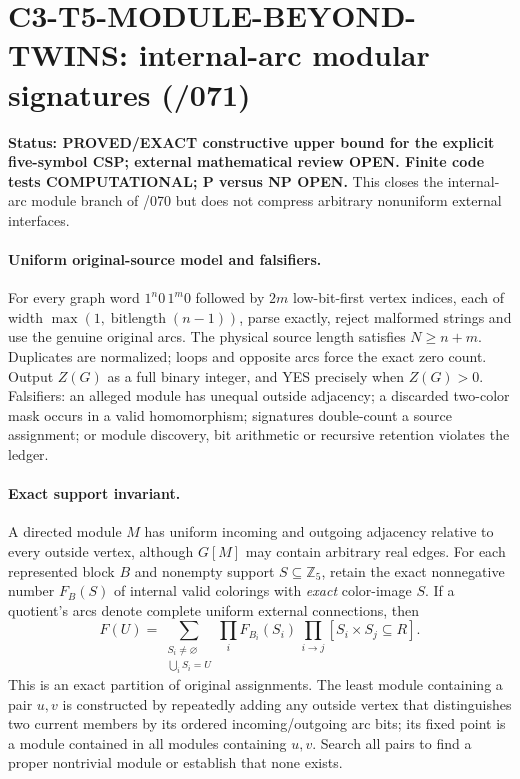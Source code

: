 \documentclass[11pt]{article}
\begin{document}
\section{C3-T5-MODULE-BEYOND-TWINS: internal-arc modular signatures (/071)}

\noindent\textbf{Status: PROVED/EXACT constructive upper bound for
the explicit five-symbol CSP; external mathematical review OPEN.
Finite code tests COMPUTATIONAL; P versus NP OPEN.}
This closes the internal-arc module branch of /070 but does not
compress arbitrary nonuniform external interfaces.

\paragraph{Uniform original-source model and falsifiers.}
For every graph word $1^n0\,1^m0$ followed by $2m$
low-bit-first vertex indices, each of width
$\max(1,\operatorname{bitlength}(n-1))$, parse exactly,
reject malformed strings and use the genuine original arcs.
The physical source length satisfies $N\ge n+m$.
Duplicates are normalized; loops and opposite arcs force
the exact zero count. Output $Z(G)$ as a full binary integer,
and YES precisely when $Z(G)>0$. Falsifiers:
an alleged module has unequal outside adjacency; a discarded
two-color mask occurs in a valid homomorphism; signatures
double-count a source assignment; or module discovery, bit
arithmetic or recursive retention violates the ledger.

\paragraph{Exact support invariant.}
A directed module $M$ has uniform incoming and outgoing
adjacency relative to every outside vertex, although $G[M]$
may contain arbitrary real edges. For each represented block $B$
and nonempty support $S\subseteq\mathbb Z_5$, retain the exact
nonnegative number $F_B(S)$ of internal valid colorings with
\emph{exact} color-image $S$. If a quotient's arcs denote
complete uniform external connections, then
\[
 F(U)=\sum_{\substack{S_i\ne\varnothing\\\bigcup_i S_i=U}}
 \prod_i F_{B_i}(S_i)\,
 \prod_{i\to j}[S_i\times S_j\subseteq R].
\]
This is an exact partition of original assignments.
The least module containing a pair $u,v$ is constructed by
repeatedly adding any outside vertex that distinguishes two
current members by its ordered incoming/outgoing arc bits;
its fixed point is a module contained in all modules
containing $u,v$. Search all pairs to find a proper
nontrivial module or establish that none exists.
\end{document}
